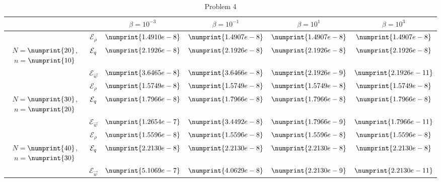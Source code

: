 \begin{table}
\begin{tabular}{ ||c|| c | c | c | c | c ||}
\hline
& & $\beta = 10^{-3}$ & $\beta = 10^{-1}$ & $\beta = 10^{1}$ & $\beta = 10^{3}$  \\
\hline
 & $\mathcal{E}_\rho$ & $\numprint{1.4910e-8}$ & $\numprint{1.4907e-8}$ & $\numprint{1.4907e-8}$ & $\numprint{1.4907e-8}$ \\
 $N = $$\numprint{20}$, $n = $$\numprint{10}$  & $\mathcal{E}_q$ & $\numprint{2.1926e-8}$ & $\numprint{2.1926e-8}$ & $\numprint{2.1926e-8}$ & $\numprint{2.1926e-8}$ \\
& $\mathcal{E}_{\vec{w}}$ & $\numprint{3.6465e-8}$ & $\numprint{3.6466e-8}$ & $\numprint{2.1926e-9}$ & $\numprint{2.1926e-11}$ \\
\hline
 & $\mathcal{E}_\rho$ & $\numprint{1.5749e-8}$ & $\numprint{1.5749e-8}$ & $\numprint{1.5749e-8}$ & $\numprint{1.5749e-8}$ \\
 $N = $$\numprint{30}$, $n = $$\numprint{20}$  & $\mathcal{E}_q$ & $\numprint{1.7966e-8}$ & $\numprint{1.7966e-8}$ & $\numprint{1.7966e-8}$ & $\numprint{1.7966e-8}$ \\
& $\mathcal{E}_{\vec{w}}$ & $\numprint{1.2654e-7}$ & $\numprint{3.4492e-8}$ & $\numprint{1.7966e-9}$ & $\numprint{1.7966e-11}$ \\
\hline
 & $\mathcal{E}_\rho$ & $\numprint{1.5596e-8}$ & $\numprint{1.5596e-8}$ & $\numprint{1.5596e-8}$ & $\numprint{1.5596e-8}$ \\
 $N = $$\numprint{40}$, $n = $$\numprint{30}$  & $\mathcal{E}_q$ & $\numprint{2.2130e-8}$ & $\numprint{2.2130e-8}$ & $\numprint{2.2130e-8}$ & $\numprint{2.2130e-8}$ \\
& $\mathcal{E}_{\vec{w}}$ & $\numprint{5.1069e-7}$ & $\numprint{4.0629e-8}$ & $\numprint{2.2130e-9}$ & $\numprint{2.2130e-11}$ \\
\hline
\end{tabular}
\caption{Problem 4}
\label{TabA1:Prob4}
\end{table}